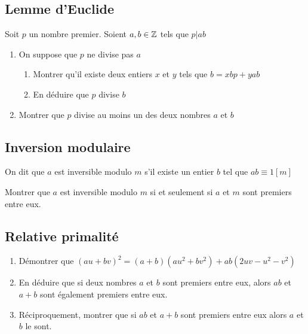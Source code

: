 \documentclass[oneside,12pt]{book}          %
\begin{document}
\subsection{Lemme d'Euclide}
Soit $p$ un nombre premier. Soient $a,b\in{\mathbb Z}$ tels que $p\vert ab$
\begin{enumerate}
	\item On suppose que $p$ ne divise pas $a$
	\begin{enumerate}
		\item Montrer qu'il existe deux entiers $x$ et $y$ tels que $b=xbp+yab$
		\item En déduire que $p$ divise $b$
	\end{enumerate}
	\item Montrer que $p$ divise au moins un des deux nombres $a$ et $b$
\end{enumerate}



\subsection{Inversion modulaire}
On dit que $a$ est inversible modulo $m$ s'il existe un entier $b$ tel que $ab\equiv1[m]$

Montrer que $a$ est inversible modulo $m$ si et seulement si $a$ et $m$ sont premiers entre eux.



\subsection{Relative primalité}
\begin{enumerate}
	\item Démontrer que $(au+bv)^2=(a+b)(au^2+bv^2)+ab(2uv-u^2-v^2)$
	\item En déduire que si deux nombres $a$ et $b$ sont premiers entre eux, alors $ab$ et $a+b$ sont également premiers entre eux.
	\item Réciproquement, montrer que si $ab$ et $a+b$ sont premiers entre eux alors $a$ et $b$ le sont.
\end{enumerate}
\end{document}
